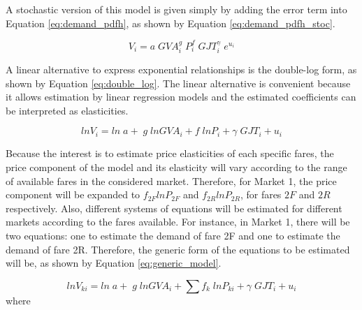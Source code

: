 



A stochastic version of this model is given simply by adding the error term into Equation \ref{eq:demand_pdfh}, as shown by Equation \ref{eq:demand_pdfh_stoc}.

\begin{equation}
\label{eq:demand_pdfh_stoc}
V_{i} = a \; {GVA}^g_i \; P^f_i \; GJT^\gamma_i \; e^{u_i}
\end{equation}

A linear alternative to express exponential relationships is the double-log form, as shown by Equation \ref{eq:double_log}. The linear alternative is convenient because it allows estimation by linear regression models and the estimated coefficients can be interpreted as elasticities. %

\begin{equation}
\label{eq:double_log}
ln V_{i} = ln \; a + \; g \; ln {GVA}_i + f \; ln P_i + \gamma \; GJT_i + u_i
\end{equation}

Because the interest is to estimate price elasticities of each specific fares, the price component of the model and its elasticity will vary according to the range of available fares in the considered market. Therefore, for Market 1, the price component will be expanded to $f_{2F} ln P_{2F}$ and $f_{2R} ln P_{2R}$, for fares $2F$ and $2R$ respectively. Also, different systems of equations will be estimated for different markets according to the fares available. For instance, in Market 1, there will be two equations: one to estimate the demand of fare 2F and one to estimate the demand of fare 2R. Therefore, the generic form of the equations to be estimated will be, as shown by Equation \ref{eq:generic_model}.

\begin{equation}
\label{eq:generic_model}
ln V_{ki} = ln \; a + \; g \; ln {GVA}_i + \sum{f_{k} \; ln P_{ki}} + \gamma \; GJT_i + u_i
\end{equation}
where

